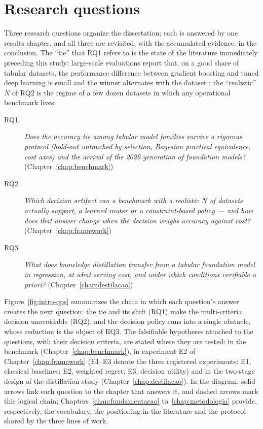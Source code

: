 \section{Research questions}
\label{sec:intro-qps}

Three research questions organize the dissertation; each is answered
by one results chapter, and all three are revisited, with the
accumulated evidence, in the conclusion. The ``tie'' that RQ1 refers
to is the state of the literature immediately preceding this study:
large-scale evaluations report that, on a good share of tabular
datasets, the performance difference between gradient boosting and
tuned deep learning is small and the winner alternates with the
dataset \citep{mcelfresh2023}; the ``realistic'' $N$ of RQ2 is the
regime of a few dozen datasets in which any operational benchmark
lives.

\begin{description}
  \item[RQ1.] \emph{Does the accuracy tie among tabular model
    families survive a rigorous protocol (hold-out untouched by
    selection, Bayesian practical equivalence, cost axes) and the
    arrival of the 2026 generation of foundation models?}
    (Chapter~\ref{chap:benchmark})
  \item[RQ2.] \emph{Which decision artifact can a benchmark with a
    realistic $N$ of datasets actually support, a learned router or a
    constraint-based policy --- and how does that answer change when
    the decision weighs accuracy against cost?}
    (Chapter~\ref{chap:framework})
  \item[RQ3.] \emph{What does knowledge distillation transfer from a
    tabular foundation model in regression, at what serving cost, and
    under which conditions verifiable a priori?}
    (Chapter~\ref{chap:destilacao})
\end{description}

Figure~\ref{fig:intro-qps} summarizes the chain in which each
question's answer creates the next question: the tie and its shift
(RQ1) make the multi-criteria decision unavoidable (RQ2), and the
decision policy runs into a single obstacle, whose reduction is the
object of RQ3. The falsifiable hypotheses attached to the questions,
with their decision criteria, are stated where they are tested: in
the benchmark (Chapter~\ref{chap:benchmark}), in experiment E2 of
Chapter~\ref{chap:framework} (E1--E3 denote the three registered
experiments:
E1, classical baselines; E2, weighted regret; E3, decision utility)
and in the two-stage design of the
distillation study (Chapter~\ref{chap:destilacao}). In the diagram,
solid arrows link each question to the chapter that answers it, and
dashed arrows mark this logical chain; Chapters~\ref{chap:fundamentacao}
to~\ref{chap:metodologia} provide, respectively, the vocabulary, the
positioning in the literature and the protocol shared by the three
lines of work.


